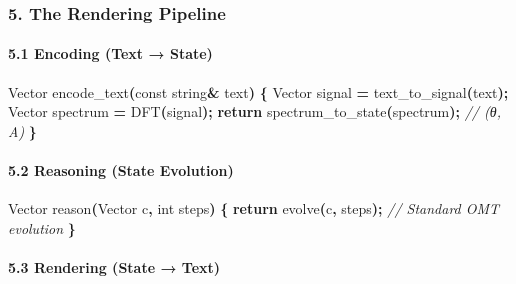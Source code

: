 \documentclass[
  11pt,
  a4paper,
]{article}
\newenvironment{Shaded}{\begin{snugshade}}{\end{snugshade}}
\newcommand{\AttributeTok}[1]{\textcolor[rgb]{0.13,0.29,0.53}{#1}}
\newcommand{\CommentTok}[1]{\textcolor[rgb]{0.56,0.35,0.01}{\textit{#1}}}
\newcommand{\ControlFlowTok}[1]{\textcolor[rgb]{0.13,0.29,0.53}{\textbf{#1}}}
\newcommand{\DataTypeTok}[1]{\textcolor[rgb]{0.13,0.29,0.53}{#1}}
\newcommand{\NormalTok}[1]{#1}
\newcommand{\OperatorTok}[1]{\textcolor[rgb]{0.81,0.36,0.00}{\textbf{#1}}}
\begin{document}
\subsubsection{5. The Rendering Pipeline}\label{the-rendering-pipeline}

\paragraph{5.1 Encoding (Text → State)}\label{encoding-text-state}

\begin{Shaded}
\begin{Highlighting}[]
\NormalTok{Vector encode\_text}\OperatorTok{(}\AttributeTok{const}\NormalTok{ string}\OperatorTok{\&}\NormalTok{ text}\OperatorTok{)} \OperatorTok{\{}
\NormalTok{    Vector signal }\OperatorTok{=}\NormalTok{ text\_to\_signal}\OperatorTok{(}\NormalTok{text}\OperatorTok{);}
\NormalTok{    Vector spectrum }\OperatorTok{=}\NormalTok{ DFT}\OperatorTok{(}\NormalTok{signal}\OperatorTok{);}
    \ControlFlowTok{return}\NormalTok{ spectrum\_to\_state}\OperatorTok{(}\NormalTok{spectrum}\OperatorTok{);}  \CommentTok{// (θ, A)}
\OperatorTok{\}}
\end{Highlighting}
\end{Shaded}

\paragraph{5.2 Reasoning (State
Evolution)}\label{reasoning-state-evolution}

\begin{Shaded}
\begin{Highlighting}[]
\NormalTok{Vector reason}\OperatorTok{(}\NormalTok{Vector c}\OperatorTok{,} \DataTypeTok{int}\NormalTok{ steps}\OperatorTok{)} \OperatorTok{\{}
    \ControlFlowTok{return}\NormalTok{ evolve}\OperatorTok{(}\NormalTok{c}\OperatorTok{,}\NormalTok{ steps}\OperatorTok{);}  \CommentTok{// Standard OMT evolution}
\OperatorTok{\}}
\end{Highlighting}
\end{Shaded}

\paragraph{5.3 Rendering (State → Text)}\label{rendering-state-text}
\end{document}
